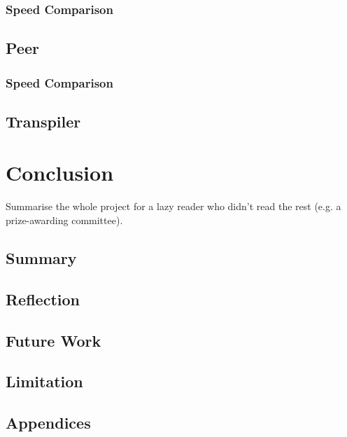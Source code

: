 \documentclass{l4proj}
\begin{document}
\subsection{Speed Comparison}
\section{Peer}
\subsection{Speed Comparison}
\section{Transpiler}

\chapter{Conclusion}    
Summarise the whole project for a lazy reader who didn't read the rest (e.g. a prize-awarding committee).
\section{Summary}
\section{Reflection}
\section{Future Work}
\section{Limitation}

%
% 

\begin{appendices}
\chapter{Appendices}
\end{appendices}






\end{document}
